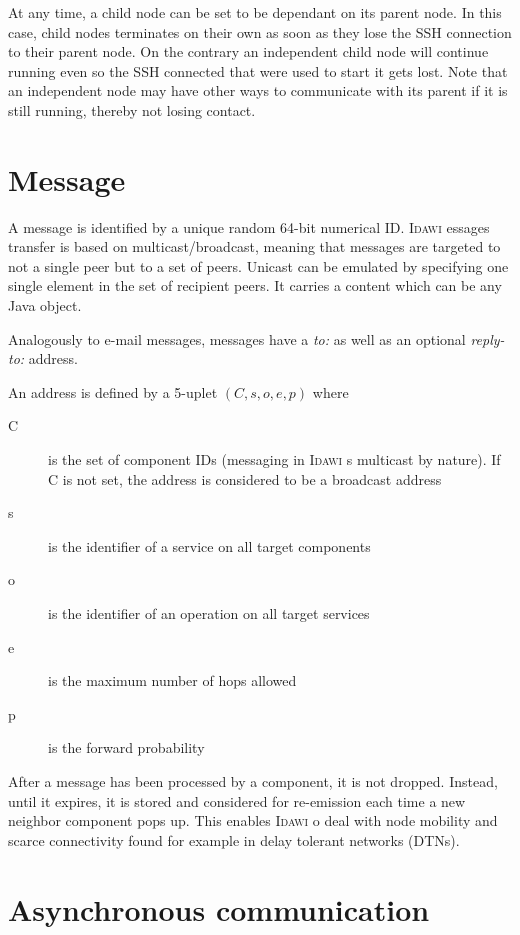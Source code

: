 \documentclass{article}
\newcommand{\idawi}[1]{\textsc{Idawi}\xspace}
\begin{document}
At any time, a child node can be set to be dependant on its parent node. In this case, child nodes terminates on their own as soon as they lose the SSH connection to their parent node. On the contrary an independent child node will continue running even so the SSH connected that were used to start it gets lost. Note that an independent node may have other ways to communicate with its parent if it is still running, thereby not losing contact.


\section{Message}

A message is identified by a unique random 64-bit numerical ID.
\idawi messages transfer is based on multicast/broadcast, meaning that  messages are targeted to not a single peer but to a set of peers. Unicast can be emulated by specifying one single element in the set of recipient peers.  It carries a content which can be any Java object. 


Analogously to e-mail messages, messages have a {\em to:} as well as an optional {\em reply-to:} address.

An address is defined by a 5-uplet $(C, s, o, e, p)$ where
\begin{description}
\item[C] is the set of component IDs (messaging in \idawi is multicast by nature). If C is not set, the address is considered to be a broadcast address
\item[s] is the identifier of a service on all target components
\item[o] is the identifier of an operation on all target services
\item[e] is the maximum number of hops allowed
\item[p] is the forward probability
\end{description}

After a message has been processed by a component, it is not dropped. Instead, until it expires, it is stored and considered for re-emission each time a new neighbor component pops up. This enables \idawi to deal with node mobility and scarce connectivity found for example in delay tolerant networks (DTNs).


\section{Asynchronous communication}
\end{document}
